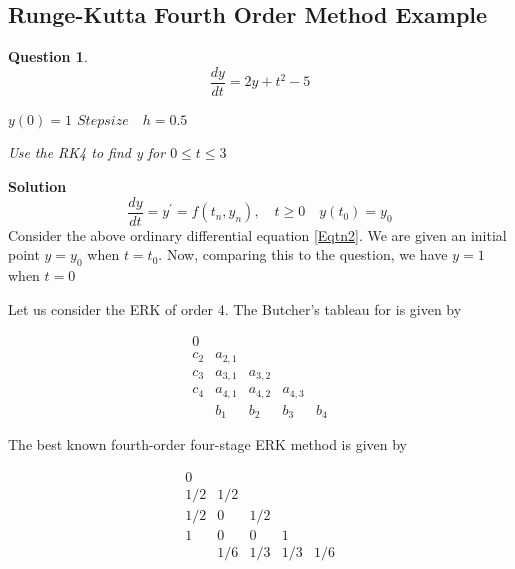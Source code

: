 \documentclass[12pt,a4paper]{article}
\newtheorem{question}{Question}[theorem]
\begin{document}
\subsection{Runge-Kutta Fourth Order Method Example}
\begin{question}
\begin{equation}\label{Eqtn1}
\frac{dy}{dt} = 2y + t^2 - 5
\end{equation}
\begin{center}
$ y(0)=1 $ \qquad
$Step size \quad h = 0.5 $

Use the RK4 to find y for $0\leq t \leq 3$
\end{center}

\end{question}
\hspace{2pt}

\noindent 
\textbf{Solution}
\begin{equation}\label{Eqtn2}
\frac{dy}{dt} = y^\prime = f(t_n,y_n), \quad
 t\geq 0 \quad y(t_0)= y_0 
\end{equation}
Consider the above ordinary differential equation \ref{Eqtn2}. We are given an initial point $y = y_0$ when $ t=t_0 $. Now, comparing this to the question, we have $y = 1 $ when $ t=0 $

\noindent
Let us consider the ERK of order 4. The Butcher's tableau for is given by

\begin{equation}\label{table1}
  \begin{array}{c|cccc}
    0        \\
    c_2       & a_{2,1}  \\
    c_3       & a_{3,1}  &  a_{3,2}  \\
    c_4       & a_{4,1}  &  a_{4,2}   & a_{4,3} \\
    \hline
    \,        & b_1      & b_2       &b_3     & b_4
  \end{array}
\end{equation}

\noindent
The best known fourth-order four-stage ERK method is given by

\begin{equation}\label{table2}
  \begin{array}{c|cccc}
    0        \\
    1/2     & 1/2  \\
    1/2     & 0  &  1/2  \\
    1       & 0  &  0   & 1 \\
    \hline
    \,        & 1/6      & 1/3      &1/3     & 1/6
  \end{array}
\end{equation}
\end{document}

